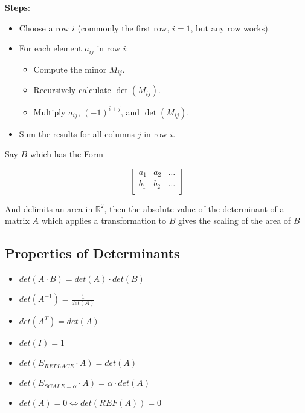 \documentclass{report}
\begin{document}
\noindent \textbf{Steps}:
\begin{itemize}
	\item Choose a row \( i \) (commonly the first row, \( i = 1 \), but any row works).
	\item For each element \( a_{ij} \) in row \( i \):
	      \begin{itemize}
		      \item Compute the minor \( M_{ij} \).
		      \item Recursively calculate \( \det(M_{ij}) \).
		      \item Multiply \( a_{ij} \), \( (-1)^{i+j} \), and \( \det(M_{ij}) \).
	      \end{itemize}
	\item Sum the results for all columns \( j \) in row \( i \).
\end{itemize}

Say \(B\) which has the Form

\[
	\begin{bmatrix}
		a_1 & a_2 & \dots \\
		b_1 & b_2 & \dots \\
	\end{bmatrix}
\]

And delimits an area in \( \mathbb{R}^2 \), then the absolute value of the determinant of a matrix \(A\) which applies a transformation to \(B\) gives the scaling of the area of \(B\)

\subsection{Properties of Determinants}


\begin{multicols}{2}
	\begin{itemize}
		\item \(det(A \cdot B) = det(A) \cdot det(B)\)
		\item \(det(A^{-1}) = \frac{1}{det(A)}\)
		\item \(det(A^T) = det(A)\)
		\item \(det(I)=1\)
		\item \(det(E_{REPLACE} \cdot A) = det(A)\)
		\item \(det(E_{SCALE= \alpha} \cdot A) = \alpha \cdot det(A)\)
		\item \(det(A) = 0 \Leftrightarrow det(REF(A))= 0\)
	\end{itemize}
\end{multicols}
\end{document}
